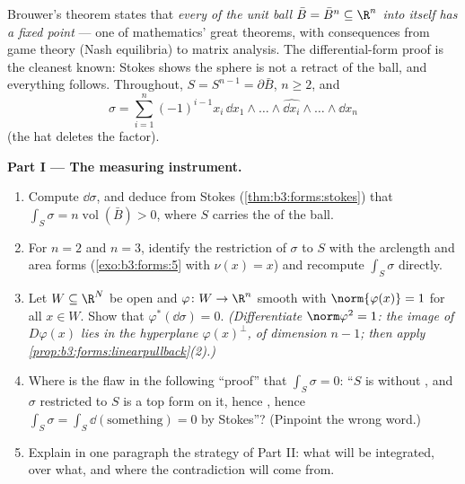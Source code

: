\begin{problem}\label{pb:b3:forms:1}
Brouwer's theorem states that \emph{every  of
the  unit ball $\bar B = \bar B^n \subseteq \R^n$ into
itself has a fixed point} --- one of mathematics' great
theorems, with consequences from game theory (Nash
equilibria) to matrix analysis. The differential-form proof
is the cleanest known: Stokes shows the sphere is not a
retract of the ball, and everything follows. Throughout,
$S = S^{n-1} = \partial\bar B$, $n \geq 2$, and
\[
\sigma = \sum_{i=1}^n(-1)^{i-1}x_i\,
\dd x_1\wedge\dots\wedge\widehat{\dd x_i}\wedge\dots\wedge
\dd x_n
\]
(the hat deletes the factor).

\medskip
\noindent\textbf{Part I --- The measuring instrument.}
\begin{enumerate}
  \item Compute $\dd\sigma$, and deduce from Stokes
        (\cref{thm:b3:forms:stokes}) that $\int_S\sigma =
        n\operatorname{vol}(\bar B) > 0$, where $S$ carries
        the   of the ball.
  \item For $n = 2$ and $n = 3$, identify the restriction of
        $\sigma$ to $S$ with the arclength and area forms
        (\cref{exo:b3:forms:5} with $\nu(x) = x$) and
        recompute $\int_S\sigma$ directly.
  \item Let $W \subseteq \R^N$ be open and $\varphi\colon W
        \to \R^n$ smooth with $\norm{\varphi(x)} = 1$ for
        all $x \in W$. Show that
        $\varphi^*(\dd\sigma) = 0$. \emph{(Differentiate
        $\norm\varphi^2 = 1$: the image of $D\varphi(x)$
        lies in the hyperplane $\varphi(x)^\perp$, of
        dimension $n - 1$; then apply
        \cref{prop:b3:forms:linearpullback}(2).)}
  \item Where is the flaw in the following ``proof'' that
        $\int_S\sigma = 0$: ``$S$ is  without
        , and $\sigma$ restricted to $S$ is a top
        form on it, hence , hence $\int_S\sigma =
        \int_S\dd(\text{something}) = 0$ by Stokes''?
        (Pinpoint the wrong word.)
  \item Explain in one paragraph the strategy of Part II:
        what will be integrated, over what, and where the
        contradiction will come from.
\end{enumerate}


\end{problem}
